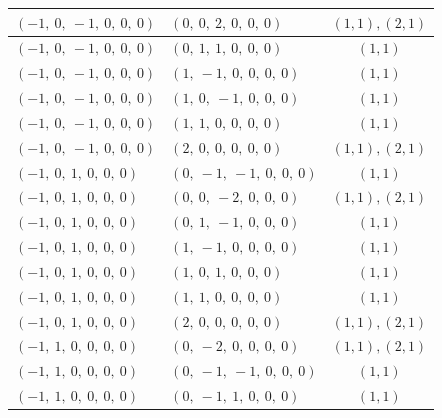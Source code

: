 \documentclass[11pt]{article}
\theoremstyle{definition}
\begin{document}
\begin{center}
\begin{tabular}{|l|l|c|}
    \hline
    $\left( -1, \  0, \  -1, \  0, \  0, \  0\right)$ & $\left( 0, \  0, \  2, \  0, \  0, \  0\right)$ & $(1,1), (2,1)$ \\
    \hline
    $\left( -1, \  0, \  -1, \  0, \  0, \  0\right)$ & $\left( 0, \  1, \  1, \  0, \  0, \  0\right)$ & $(1,1)$ \\
    \hline
    $\left( -1, \  0, \  -1, \  0, \  0, \  0\right)$ & $\left( 1, \  -1, \  0, \  0, \  0, \  0\right)$ & $(1,1)$ \\
    \hline
    $\left( -1, \  0, \  -1, \  0, \  0, \  0\right)$ & $\left( 1, \  0, \  -1, \  0, \  0, \  0\right)$ & $(1,1)$ \\
    \hline
    $\left( -1, \  0, \  -1, \  0, \  0, \  0\right)$ & $\left( 1, \  1, \  0, \  0, \  0, \  0\right)$ & $(1,1)$ \\
    \hline
    $\left( -1, \  0, \  -1, \  0, \  0, \  0\right)$ & $\left( 2, \  0, \  0, \  0, \  0, \  0\right)$ & $(1,1), (2,1)$ \\
    \hline
    $\left( -1, \  0, \  1, \  0, \  0, \  0\right)$ & $\left( 0, \  -1, \  -1, \  0, \  0, \  0\right)$ & $(1,1)$ \\
    \hline
    $\left( -1, \  0, \  1, \  0, \  0, \  0\right)$ & $\left( 0, \  0, \  -2, \  0, \  0, \  0\right)$ & $(1,1), (2,1)$ \\
    \hline
    $\left( -1, \  0, \  1, \  0, \  0, \  0\right)$ & $\left( 0, \  1, \  -1, \  0, \  0, \  0\right)$ & $(1,1)$ \\
    \hline
    $\left( -1, \  0, \  1, \  0, \  0, \  0\right)$ & $\left( 1, \  -1, \  0, \  0, \  0, \  0\right)$ & $(1,1)$ \\
    \hline
    $\left( -1, \  0, \  1, \  0, \  0, \  0\right)$ & $\left( 1, \  0, \  1, \  0, \  0, \  0\right)$ & $(1,1)$ \\
    \hline
    $\left( -1, \  0, \  1, \  0, \  0, \  0\right)$ & $\left( 1, \  1, \  0, \  0, \  0, \  0\right)$ & $(1,1)$ \\
    \hline
    $\left( -1, \  0, \  1, \  0, \  0, \  0\right)$ & $\left( 2, \  0, \  0, \  0, \  0, \  0\right)$ & $(1,1), (2,1)$ \\
    \hline
    $\left( -1, \  1, \  0, \  0, \  0, \  0\right)$ & $\left( 0, \  -2, \  0, \  0, \  0, \  0\right)$ & $(1,1), (2,1)$ \\
    \hline
    $\left( -1, \  1, \  0, \  0, \  0, \  0\right)$ & $\left( 0, \  -1, \  -1, \  0, \  0, \  0\right)$ & $(1,1)$ \\
    \hline
    $\left( -1, \  1, \  0, \  0, \  0, \  0\right)$ & $\left( 0, \  -1, \  1, \  0, \  0, \  0\right)$ & $(1,1)$ \\

\end{tabular}
\end{center}
\end{document}
